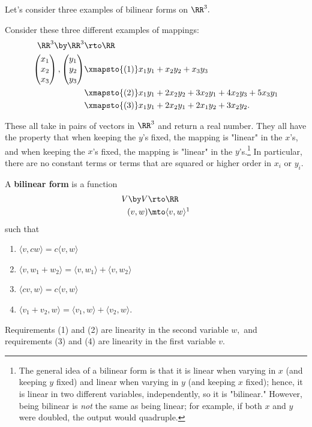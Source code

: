 Let's consider three examples of bilinear forms on $\RR^3.$
\begin{example}\label{bilinear forms}

Consider these three different examples of mappings:
\begin{align*} \RR^3 \by \RR^3 &\rto \RR \\
\begin{pmatrix}
x_1 \\ x_2 \\ x_3
\end{pmatrix},
\begin{pmatrix}
y_1 \\ y_2 \\ y_3
\end{pmatrix} 
& \xmapsto{(1)} x_1y_1 + x_2y_2 + x_3y_3 \\
& \xmapsto{(2)} x_1y_1 + 2x_2y_2 + 3x_2y_1 + 4x_2y_3 + 5x_3y_1 \\
& \xmapsto{(3)} x_1y_1 + 2x_2y_1 + 2x_1y_2 + 3x_2y_2.
\end{align*}

\end{example}
These all take in pairs of vectors in $\RR^3$ and return a real number. They all have the property that when keeping the $y$'s fixed, the mapping is "linear" in the $x$'s, and when keeping the $x$'s fixed, the mapping is "linear" in the $y$'s.\footnote{The general idea of a bilinear form is that it is linear when varying in $x$ (and keeping $y$ fixed) and linear when varying in $y$ (and keeping $x$ fixed); hence, it is linear in two different variables, independently, so it is "bilinear." However, being bilinear is \emph{not} the same as being linear; for example, if both $x$ and $y$ were doubled, the output would quadruple.} In particular, there are no constant terms or terms that are squared or higher order in $x_i$ or $y_i$. 

\begin{definition}
A \textbf{bilinear form} is a function \begin{align*} V \by V &\rto \RR \\
(v, w) &\mto \langle v, w \rangle\footnotemark
\end{align*} 
such that 
\begin{enumerate}
    \item $\langle v, cw \rangle = c\langle  v, w\rangle $ 
    \item $\langle v, w_1 + w_2 \rangle = \langle v, w_1 \rangle + \langle v, w_2\rangle$
    \item $\langle cv, w \rangle = c\langle v, w \rangle$ 
    \item $\langle v_1 + v_2, w \rangle = \langle v_1, w \rangle + \langle v_2, w \rangle.$
\end{enumerate}

Requirements (1) and (2) are linearity in the second variable $w,$ and requirements (3) and (4) are linearity in the first variable $v.$
\end{definition}

